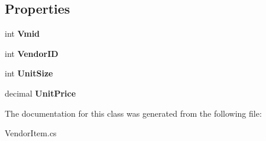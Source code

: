 \subsection*{Properties}
\begin{DoxyCompactItemize}
\item 
\mbox{\label{class_nexus_1_1_vendor_item_a33c63a67b62403f9b17df6f4f1d0f409}} 
int {\bfseries Vmid}
\item 
\mbox{\label{class_nexus_1_1_vendor_item_a2f0f773216575fa088e496376ea76a5d}} 
int {\bfseries Vendor\+ID}
\item 
\mbox{\label{class_nexus_1_1_vendor_item_a1542c6230d888e03ef291fb2f8988f7b}} 
int {\bfseries Unit\+Size}
\item 
\mbox{\label{class_nexus_1_1_vendor_item_a3c7b74f24f3a973f8aa673f03a06381e}} 
decimal {\bfseries Unit\+Price}
\end{DoxyCompactItemize}


The documentation for this class was generated from the following file\+:\begin{DoxyCompactItemize}
\item 
Vendor\+Item.\+cs\end{DoxyCompactItemize}
